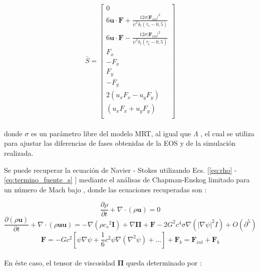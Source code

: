 \begin{equation}
    \bar{S} = 
    \left[ \begin{array}{c} 
        0\\
        6 \mathbf{u}\cdot \mathbf{F} + \frac{12 \sigma {|{\mathbf{F}_{int}|}}^{2} }{{\psi}^{2} \delta_{t} (\tau_{e} - 0,5)}\\
        6 \mathbf{u}\cdot \mathbf{F} - \frac{12 \sigma {|{\mathbf{F}_{int}|}}^{2} }{{\psi}^{2} \delta_{t} (\tau_{\zeta } - 0,5)}\\
        F_{x}\\
        -F_{x}\\
        F_{y}\\
        -F_{y}\\
        2(u_{x} F_{x} - u_{y} F_{y} )\\
        (u_{x} F_{x} + u_{y} F_{y} )\\              
    \end{array}
    \right]    
    \label{eq:termino_fuente_s}
\end{equation}
\\
donde $\sigma$ es un parámetro libre del modelo MRT, al igual que $\Lambda$ , el cual se utiliza para ajustar las diferencias de fases obtenidas de la EOS y de la simulación realizada.

Se puede recuperar la ecuación de Navier - Stokes utilizando Ecs. [\ref{eq:rho} - \ref{eq:termino_fuente_s} ] mediante el análisas de Chapman-Enskog limitado para un número de Mach bajo \cite{li2013lattice}, donde las ecuaciones recuperadas son \cite{fogliatto2019simulation} \cite{li2013lattice}:

\begin{equation}
	\frac{\partial \rho }{\partial t}  + \nabla \cdot \left( \rho \mathbf{u} \right) = 0
\end{equation}
\begin{equation}
	\frac{\partial \left( \rho \mathbf{u}\right)}{\partial t} + \nabla \cdot \left( \rho \mathbf{u} \mathbf{u}\right) = - \nabla \left( \rho {c_{s}}^{2} \mathbf{I} \right) + \nabla \mathbf{\Pi} + \mathbf{F} - 2 G^{2} c^{4} \sigma \nabla \left( {|\nabla \psi	|}^{2} I	\right) + O (\partial^{5})
\end{equation}
\begin{equation}
\mathbf{F} = - G c^{2} \left[	\psi \nabla \psi + \frac{1}{6} c^{2} \psi \nabla \left( \nabla^{2} \psi\right) + ...\right] + \mathbf{F}_{b} = \mathbf{F}_{int} + \mathbf{F}_{b}
\end{equation}
\\
En éste caso, el tensor de viscosidad $\mathbf{\Pi}$ queda determinado por :

